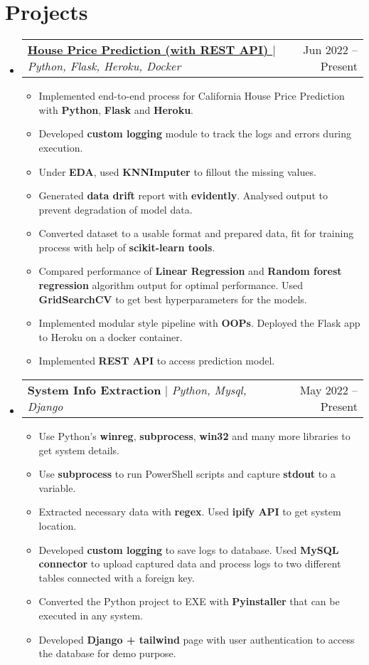 \documentclass[letterpaper,11pt]{article}
\makeatletter
\newcommand{\resumeItem}[1]{
  \item\small{
    {#1 \vspace{-2pt}}
  }
}
\newcommand{\resumeProjectHeading}[2]{
    \item
    \begin{tabular*}{0.97\textwidth}{l@{\extracolsep{\fill}}r}
      \small#1 & #2 \\
    \end{tabular*}\vspace{-7pt}
}
\newcommand{\resumeSubHeadingListStart}{\begin{itemize}[leftmargin=0.15in, label={}]}
\newcommand{\resumeSubHeadingListEnd}{\end{itemize}}
\newcommand{\resumeItemListStart}{\begin{itemize}}
\newcommand{\resumeItemListEnd}{\end{itemize}\vspace{-5pt}}
\makeatother
\begin{document}
\section{Projects}
    \resumeSubHeadingListStart
      \resumeProjectHeading
          {\textbf{\href{https://github.com/bheemaguli/House-Price-Prediction}{House Price Prediction (with REST API) {\tiny \color{blue} \faLink}}} $|$ \emph{Python, Flask, Heroku, Docker}}{Jun 2022 -- Present}
          \resumeItemListStart
            \resumeItem{Implemented end-to-end process for California House Price Prediction with {\bfseries{Python}}, {\bfseries{Flask}} and {\bfseries{Heroku}}.}
            \resumeItem{Developed {\bfseries{custom logging}} module to track the logs and errors during execution.}
            \resumeItem{Under {\bfseries{EDA}}, used {\bfseries{KNNImputer}} to fillout the missing values.}
            \resumeItem{Generated {\bfseries{data drift}} report with {\bfseries{evidently}}. Analysed output to prevent degradation of model data.}
            \resumeItem{Converted dataset to a usable format and prepared data, fit for training process with help of {\bfseries{scikit-learn tools}}.}
            \resumeItem{Compared performance of {\bfseries{Linear Regression}} and {\bfseries{Random forest regression}} algorithm output for optimal performance. Used {\bfseries{GridSearchCV}} to get best hyperparameters for the models.}
            \resumeItem{Implemented modular style pipeline with {\bfseries{OOPs}}. Deployed the Flask app to Heroku on a docker container.}
            \resumeItem{Implemented {\bfseries{REST API}} to access prediction model.}
          \resumeItemListEnd
      \resumeProjectHeading
          {\textbf{System Info Extraction} $|$ \emph{Python, Mysql, Django}}{May 2022 -- Present}
          \resumeItemListStart
            \vspace{4pt}
            {\begin{adjustwidth*}{-0.5cm}{-0.5cm}{Client: Dubai based Large Commodity Trading Company}\vspace{-2pt}\end{adjustwidth*}}
            \resumeItem{Use Python's {\bfseries{winreg}}, {\bfseries{subprocess}}, {\bfseries{win32}} and many more libraries to get system details.}
            \resumeItem{Use {\bfseries{subprocess}} to run PowerShell scripts and capture {\bfseries{stdout}} to a variable.}
            \resumeItem{Extracted necessary data with {\bfseries{regex}}. Used {\bfseries{ipify API}} to get system location.}
            \resumeItem{Developed {\bfseries{custom logging}} to save logs to database. Used {\bfseries{MySQL connector}} to upload captured data and process logs to two different tables connected with a foreign key.}
            \resumeItem{Converted the Python project to EXE with {\bfseries{Pyinstaller}} that can be executed in any system.}
            \resumeItem{Developed {\bfseries{Django + tailwind}} page with user authentication to access the database for demo purpose.}
          \resumeItemListEnd
    \resumeSubHeadingListEnd
    
\end{document}
